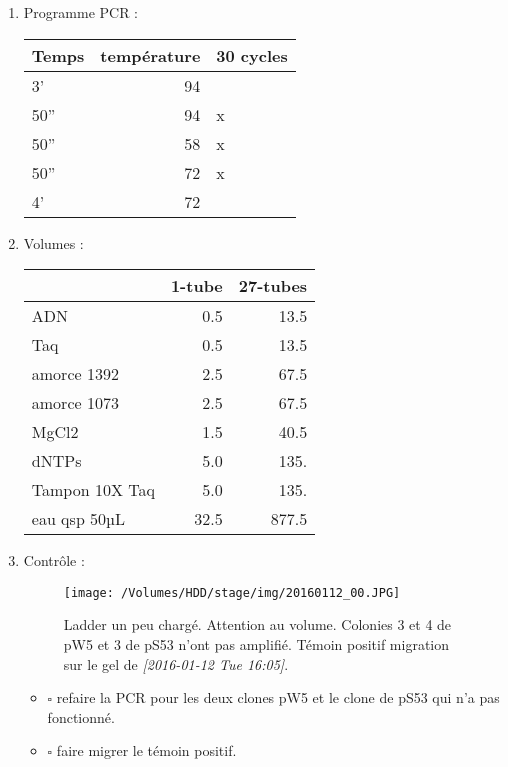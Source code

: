 \documentclass[9pt, oneside, twocolumn]{scrartcl}
\begin{document}
\begin{enumerate}
\item Programme PCR :
\label{sec:orgheadline7}
\begin{center}
\begin{tabular}{lrl}
\toprule
Temps & température & 30 cycles\\
\midrule
3' & 94 & \\
50'' & 94 & x\\
50'' & 58 & x\\
50'' & 72 & x\\
4' & 72 & \\
\bottomrule
\end{tabular}
\end{center}

\item Volumes :
\label{sec:orgheadline8}
\begin{center}
\begin{tabular}{lrr}
\toprule
 & 1-tube & 27-tubes\\
\midrule
ADN & 0.5 & 13.5\\
Taq & 0.5 & 13.5\\
amorce 1392 & 2.5 & 67.5\\
amorce 1073 & 2.5 & 67.5\\
MgCl2 & 1.5 & 40.5\\
dNTPs & 5.0 & 135.\\
Tampon 10X Taq & 5.0 & 135.\\
\midrule
eau qsp 50µL & 32.5 & 877.5\\
\bottomrule
\end{tabular}
\end{center}

\item Contrôle :
\label{sec:orgheadline9}

\begin{figure}[htb]
\centering
\texttt{[image: /Volumes/HDD/stage/img/20160112\_00.JPG]}
\caption{Ladder un peu chargé. Attention au volume. Colonies 3 et 4 de pW5 et 3 de pS53 n'ont pas amplifié. Témoin positif migration sur le gel de \textit{[2016-01-12 Tue 16:05]}.}
\end{figure}

\begin{itemize}
\item $\square$ refaire la PCR pour les deux clones pW5 et le clone de pS53 qui n'a pas
fonctionné.
\item $\square$ faire migrer le témoin positif.
\end{itemize}
\end{enumerate}
\end{document}
